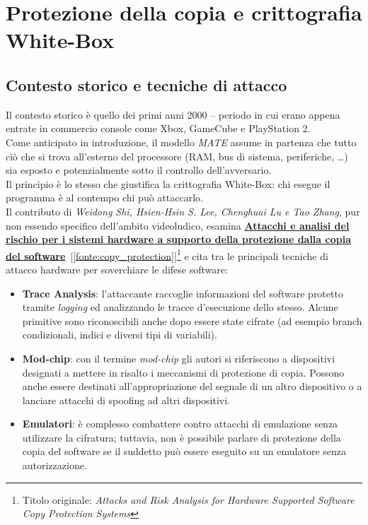 \section{Protezione della copia e crittografia White-Box}
\subsection{Contesto storico e tecniche di attacco}
Il contesto storico è quello dei primi anni 2000 -- periodo in cui erano appena entrate in commercio console come Xbox, GameCube e PlayStation 2. \\
Come anticipato in introduzione, il modello \textit{MATE} assume in partenza che tutto ciò che si trova all'esterno del processore (RAM, bus di sistema, periferiche, \ldots) sia esposto e potenzialmente sotto il controllo dell'avversario.\\
Il principio è lo stesso che giustifica la crittografia White-Box: chi esegue il programma è al contempo chi può attaccarlo. \\
Il contributo di \textit{Weidong Shi, Hsien-Hsin S. Lee, Chenghuai Lu e Tao Zhang}, pur non essendo specifico dell'ambito videoludico, esamina 
\hyperref[fonte:copy_protection]{\textbf{Attacchi e analisi del rischio per i sistemi hardware a supporto della protezione dalla copia del software}}~[\ref{fonte:copy_protection}]\footnote{Titolo originale: \textit{Attacks and Risk Analysis for Hardware Supported Software Copy Protection Systems}} e cita tra le principali tecniche di attacco hardware per soverchiare le difese software:
\begin{itemize}
    \item \textbf{Trace Analysis}: l'attaccante raccoglie informazioni del software protetto tramite \textit{logging} ed analizzando le tracce d'esecuzione dello stesso. Alcune primitive sono riconoscibili anche dopo essere state cifrate (ad esempio branch condizionali, indici e diversi tipi di variabili).
    \item \textbf{Mod-chip}: con il termine \textit{mod-chip} gli autori si riferiscono a dispositivi designati a mettere in risalto i meccanismi di protezione di copia. Possono anche essere destinati all'appropriazione del segnale di un altro dispositivo o a lanciare attacchi di spoofing ad altri dispositivi.
    \item \textbf{Emulatori}: è complesso combattere contro attacchi di emulazione senza utilizzare la cifratura; tuttavia, non è possibile parlare di protezione della copia del software se il suddetto può essere eseguito su un emulatore senza autorizzazione.
\end{itemize}
